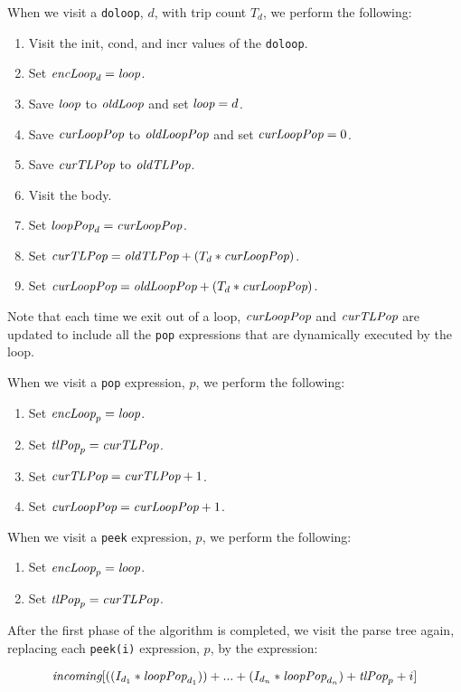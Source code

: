 \documentclass[10pt, letterpaper, onecolumn]{article}
\begin{document}
When we visit a {\tt doloop}, $d$, with trip count $T_d$, we perform
the following:
\begin{enumerate} 
\item Visit the init, cond, and incr values of the {\tt doloop}.
\item Set $\mbox{\it encLoop}_d = \mbox{\it loop}$.
\item Save $\mbox{\it loop}$ to $\mbox{\it oldLoop}$ and set $\mbox{\it loop} = d$.
\item Save $\mbox{\it curLoopPop}$ to $\mbox{\it oldLoopPop}$ and set $\mbox{\it curLoopPop} = 0$.
\item Save $\mbox{\it curTLPop}$ to $\mbox{\it oldTLPop}$.
\item Visit the body.
\item Set $\mbox{\it loopPop}_d = \mbox{\it curLoopPop}$.
\item Set $\mbox{\it curTLPop} = \mbox{\it oldTLPop} + (T_d * \mbox{\it curLoopPop})$.
\item Set $\mbox{\it curLoopPop} = \mbox{\it oldLoopPop} + (T_d * \mbox{\it curLoopPop})$.
\end{enumerate}
Note that each time we exit out of a loop, $\mbox{\it curLoopPop}$ and
$\mbox{\it curTLPop}$ are updated to include all the {\tt pop} expressions
that are dynamically executed by the loop.

When we visit a {\tt pop} expression, $p$, we perform the following:
\begin{enumerate}
\item Set $\mbox{\it encLoop}_p = \mbox{\it loop}$.
\item Set $\mbox{\it tlPop}_p = \mbox{\it curTLPop}$.
\item Set $\mbox{\it curTLPop} = \mbox{\it curTLPop} + 1$.
\item Set $\mbox{\it curLoopPop} = \mbox{\it curLoopPop} + 1$.
\end{enumerate}

When we visit a {\tt peek} expression, $p$, we perform the following:
\begin{enumerate}
\item Set $\mbox{\it encLoop}_p = \mbox{\it loop}$.
\item Set $\mbox{\it tlPop}_p = \mbox{\it curTLPop}$.
\end{enumerate}

After the first phase of the algorithm is completed, we visit the
parse tree again, replacing each {\tt peek(i)} expression, $p$, by the
expression:

\begin{displaymath}
\mbox{\it incoming}[((I_{d_1} * \mbox{\it loopPop}_{d_1})) + ... + 
(I_{d_n} * \mbox{\it loopPop}_{d_n}) + \mbox{\it tlPop}_p + i]
\end{displaymath}
\end{document}
